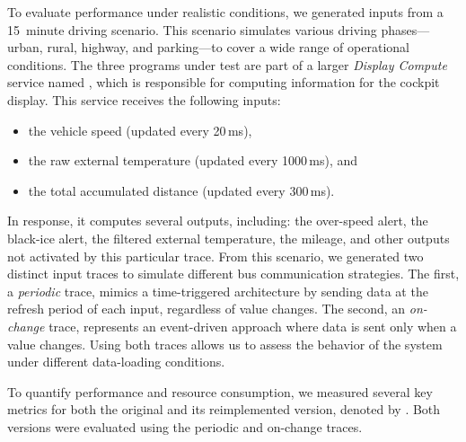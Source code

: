 To evaluate performance under realistic conditions, we generated inputs from a 15~minute driving
scenario. This scenario simulates various driving phases---urban, rural, highway, and parking---to
cover a wide range of operational conditions. The three programs under test are part of a larger
\emph{Display Compute} service named \dispute, which is responsible for computing information for
the cockpit display. This service receives the following inputs:
%
\begin{itemize}
    \item the vehicle speed (updated every 20\,ms),
    \item the raw external temperature (updated every 1000\,ms), and
    \item the total accumulated distance (updated every 300\,ms).
\end{itemize}
%
In response, it computes several outputs, including:
%
the over-speed alert,
the black-ice alert,
the filtered external temperature,
the mileage, and
other outputs not activated by this particular trace.
%
From this scenario, we generated two distinct input traces to simulate different bus communication
strategies. The first, a \emph{periodic} trace, mimics a time-triggered architecture by sending
data at the refresh period of each input, regardless of value changes. The second, an
\emph{on-change} trace, represents an event-driven approach where data is sent only when a value
changes. Using both traces allows us to assess the behavior of the system under different
data-loading conditions.

To quantify performance and resource consumption, we measured several key metrics for both the
original \dispute and its reimplemented version, denoted by \disgrust. Both versions were evaluated
using the periodic and on-change traces.

